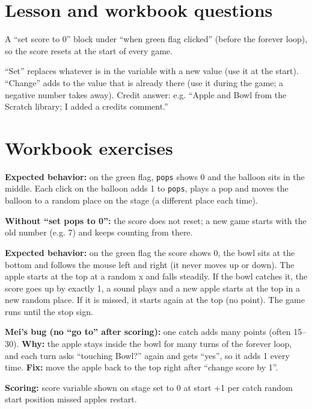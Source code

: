 
\section{Lesson and workbook questions}
\begin{answer}
A \enquote{set score to 0} block under \enquote{when green flag clicked} (before the forever loop), so the score resets at the start of every game.
\end{answer}

\begin{answer}
\enquote{Set} replaces whatever is in the variable with a new value (use it at the start). \enquote{Change} adds to the value that is already there (use it during the game; a negative number takes away). Credit answer: e.g. \enquote{Apple and Bowl from the Scratch library; I added a credits comment.}
\end{answer}

\section{Workbook exercises}
\begin{answer}
\textbf{Expected behavior:} on the green flag, \texttt{pops} shows 0 and the balloon sits in the middle. Each click on the balloon adds 1 to \texttt{pops}, plays a pop and moves the balloon to a random place on the stage (a different place each time).

\textbf{Without \enquote{set pops to 0}:} the score does not reset; a new game starts with the old number (e.g. 7) and keeps counting from there.
\end{answer}

\begin{answer}
\textbf{Expected behavior:} on the green flag the score shows 0, the bowl sits at the bottom and follows the mouse left and right (it never moves up or down). The apple starts at the top at a random x and falls steadily. If the bowl catches it, the score goes up by exactly 1, a sound plays and a new apple starts at the top in a new random place. If it is missed, it starts again at the top (no point). The game runs until the stop sign.

\textbf{Mei's bug (no \enquote{go to} after scoring):} one catch adds many points (often 15--30). \textbf{Why:} the apple stays inside the bowl for many turns of the forever loop, and each turn asks \enquote{touching Bowl?} again and gets \enquote{yes}, so it adds 1 every time. \textbf{Fix:} move the apple back to the top right after \enquote{change score by 1}.

\textbf{Scoring:} \tickbox{} score variable shown on stage \quad \tickbox{} set to 0 at start \quad \tickbox{} +1 per catch \quad \tickbox{} random start position \quad \tickbox{} missed apples restart.
\end{answer}

